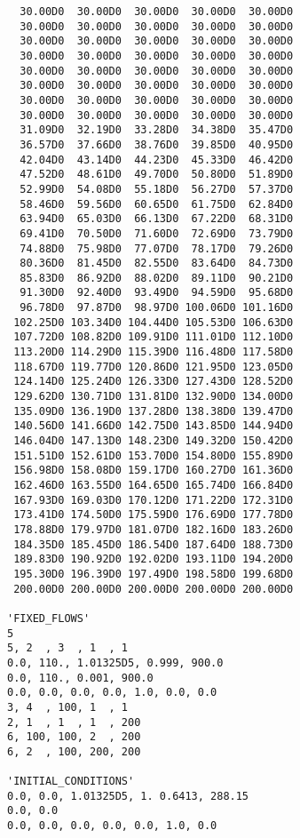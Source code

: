 \begin{verbatim}
  30.00D0  30.00D0  30.00D0  30.00D0  30.00D0
  30.00D0  30.00D0  30.00D0  30.00D0  30.00D0
  30.00D0  30.00D0  30.00D0  30.00D0  30.00D0
  30.00D0  30.00D0  30.00D0  30.00D0  30.00D0
  30.00D0  30.00D0  30.00D0  30.00D0  30.00D0
  30.00D0  30.00D0  30.00D0  30.00D0  30.00D0
  30.00D0  30.00D0  30.00D0  30.00D0  30.00D0
  30.00D0  30.00D0  30.00D0  30.00D0  30.00D0
  31.09D0  32.19D0  33.28D0  34.38D0  35.47D0
  36.57D0  37.66D0  38.76D0  39.85D0  40.95D0
  42.04D0  43.14D0  44.23D0  45.33D0  46.42D0
  47.52D0  48.61D0  49.70D0  50.80D0  51.89D0
  52.99D0  54.08D0  55.18D0  56.27D0  57.37D0
  58.46D0  59.56D0  60.65D0  61.75D0  62.84D0
  63.94D0  65.03D0  66.13D0  67.22D0  68.31D0
  69.41D0  70.50D0  71.60D0  72.69D0  73.79D0
  74.88D0  75.98D0  77.07D0  78.17D0  79.26D0
  80.36D0  81.45D0  82.55D0  83.64D0  84.73D0
  85.83D0  86.92D0  88.02D0  89.11D0  90.21D0
  91.30D0  92.40D0  93.49D0  94.59D0  95.68D0
  96.78D0  97.87D0  98.97D0 100.06D0 101.16D0
 102.25D0 103.34D0 104.44D0 105.53D0 106.63D0
 107.72D0 108.82D0 109.91D0 111.01D0 112.10D0
 113.20D0 114.29D0 115.39D0 116.48D0 117.58D0
 118.67D0 119.77D0 120.86D0 121.95D0 123.05D0
 124.14D0 125.24D0 126.33D0 127.43D0 128.52D0
 129.62D0 130.71D0 131.81D0 132.90D0 134.00D0
 135.09D0 136.19D0 137.28D0 138.38D0 139.47D0
 140.56D0 141.66D0 142.75D0 143.85D0 144.94D0
 146.04D0 147.13D0 148.23D0 149.32D0 150.42D0
 151.51D0 152.61D0 153.70D0 154.80D0 155.89D0
 156.98D0 158.08D0 159.17D0 160.27D0 161.36D0
 162.46D0 163.55D0 164.65D0 165.74D0 166.84D0
 167.93D0 169.03D0 170.12D0 171.22D0 172.31D0
 173.41D0 174.50D0 175.59D0 176.69D0 177.78D0
 178.88D0 179.97D0 181.07D0 182.16D0 183.26D0
 184.35D0 185.45D0 186.54D0 187.64D0 188.73D0
 189.83D0 190.92D0 192.02D0 193.11D0 194.20D0
 195.30D0 196.39D0 197.49D0 198.58D0 199.68D0
 200.00D0 200.00D0 200.00D0 200.00D0 200.00D0

'FIXED_FLOWS'
5
5, 2  , 3  , 1  , 1
0.0, 110., 1.01325D5, 0.999, 900.0
0.0, 110., 0.001, 900.0
0.0, 0.0, 0.0, 0.0, 1.0, 0.0, 0.0  
3, 4  , 100, 1  , 1
2, 1  , 1  , 1  , 200
6, 100, 100, 2  , 200
6, 2  , 100, 200, 200

'INITIAL_CONDITIONS'
0.0, 0.0, 1.01325D5, 1. 0.6413, 288.15 
0.0, 0.0
0.0, 0.0, 0.0, 0.0, 0.0, 1.0, 0.0
\end{verbatim}

\newpage
